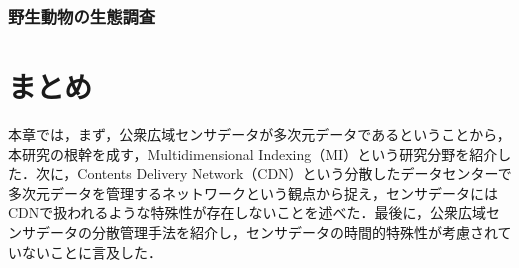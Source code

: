 \subsubsection{野生動物の生態調査}

\vspace{0.5em}




\section{まとめ}
本章では，まず，公衆広域センサデータが多次元データであるということから，本研究の根幹を成す，Multidimensional Indexing（MI）という研究分野を紹介した．次に，Contents Delivery Network（CDN）という分散したデータセンターで多次元データを管理するネットワークという観点から捉え，センサデータにはCDNで扱われるような特殊性が存在しないことを述べた．最後に，公衆広域センサデータの分散管理手法を紹介し，センサデータの時間的特殊性が考慮されていないことに言及した．
